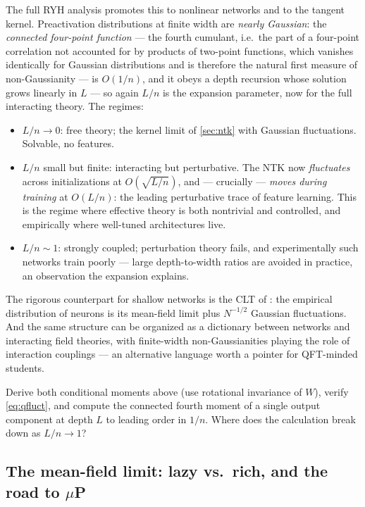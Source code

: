 \documentclass[11pt]{article}
\begin{document}
The full RYH analysis promotes this to nonlinear networks and to the
tangent kernel. Preactivation distributions at finite width are
\emph{nearly Gaussian}: the \emph{connected four-point function} --- the
fourth cumulant, i.e.\ the part of a four-point correlation not accounted
for by products of two-point functions, which vanishes identically for
Gaussian distributions and is therefore the natural first measure of
non-Gaussianity --- is $O(1/n)$, and it obeys a depth recursion whose
solution grows linearly in $L$ --- so again $L/n$ is the expansion
parameter, now for the full interacting theory.
The regimes:
\begin{itemize}
  \item $L/n \to 0$: free theory; the kernel limit of \cref{sec:ntk} with
  Gaussian fluctuations. Solvable, no features.
  \item $L/n$ small but finite: interacting but perturbative. The NTK now
  \emph{fluctuates} across initializations at $O(\sqrt{L/n})$, and ---
  crucially --- \emph{moves during training} at $O(L/n)$: the leading
  perturbative trace of feature learning. This is the regime where
  effective theory is both nontrivial and controlled, and empirically where
  well-tuned architectures live.
  \item $L/n \sim 1$: strongly coupled; perturbation theory fails, and
  experimentally such networks train poorly --- large depth-to-width ratios
  are avoided in practice, an observation the expansion explains.
\end{itemize}
The rigorous counterpart for shallow networks is the CLT of
\cite[\S20.4]{spiliopoulos2025foundations}: the empirical distribution of
neurons is its mean-field limit plus $N^{-1/2}$ Gaussian fluctuations. And
the same structure can be organized as a dictionary between networks and
interacting field theories, with finite-width non-Gaussianities playing the
role of interaction couplings \cite{halverson2021neural} --- an alternative
language worth a pointer for QFT-minded students.

\begin{exercise}
\label{ex:deep-linear-fluct}
Derive both conditional moments above (use rotational invariance of $W$),
verify \cref{eq:qfluct}, and compute the connected fourth moment of a
single output component at depth $L$ to leading order in $1/n$. Where does
the calculation break down as $L/n \to 1$?
\end{exercise}

\subsection{The mean-field limit: lazy vs.\ rich, and the road to $\mu$P}
\label{sec:mup}
\end{document}
